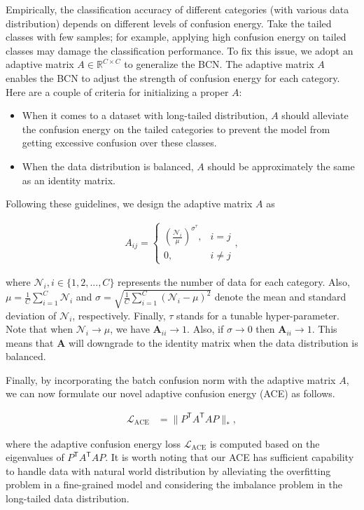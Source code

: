\documentclass{article}
\newcommand{\bA}{{\mathbf{A}}}
\newcommand{\bbR}{{\mathbb{R}}}
\newcommand{\cL}{{\mathcal{L}}}
\begin{document}
Empirically, the classification accuracy of different categories (with various data distribution) depends on different levels of confusion energy. Take the tailed classes with few samples; for example, applying high confusion energy on tailed classes may damage the classification performance. To fix this issue, we adopt an adaptive matrix $A \in \bbR^{C \times C}$ to generalize the BCN. The adaptive matrix $A$ enables the BCN to adjust the strength of confusion energy for each category. Here are a couple of criteria for initializing a proper $A$:
\begin{itemize}
    \item When it comes to a dataset with long-tailed distribution, $A$ should alleviate the confusion energy on the tailed categories to prevent the model from getting excessive confusion over these classes. 
    \item When the data distribution is balanced, $A$ should be approximately the same as an identity matrix.
\end{itemize}

Following these guidelines, we design the adaptive matrix $A$ as
\begin{linenomath}
\begin{align}
    A_{ij} = \left\{ \begin{array}{ll}
    (\frac{\mathcal{N}_i}{\mu})^{\sigma^\tau}, & i = j\\
    0,                          &  i \neq j
    \end{array}
    \right.,
    \label{eqn:A}
\end{align}
\end{linenomath}
where $\mathcal{N}_i, i \in \lbrace 1, 2, ..., C \rbrace$ represents the number of data for each category. Also, $\mu = \frac{1}{C} \sum_{i=1}^C \mathcal{N}_i$ and $\sigma = \sqrt{\frac{1}{C} \sum_{i=1}^C (\mathcal{N}_i - \mu)^2}$ denote the mean and standard deviation of $\mathcal{N}_i$, respectively. Finally, $\tau$ stands for a tunable hyper-parameter. Note that when $\mathcal{N}_i \longrightarrow \mu$, we have $\bA_{ii} \longrightarrow 1$. Also, if $\sigma \longrightarrow 0$ then $\bA_{ii} \longrightarrow 1$. This means that $\bA$ will downgrade to the identity matrix when the data distribution is balanced.

Finally, by incorporating the batch confusion norm with the adaptive matrix $A$, we can now formulate our novel adaptive confusion energy (ACE) as follows. 
\begin{linenomath}
\begin{align}
    \mathcal{L}_\mathrm{ACE} & = \| P^\mathsf{T} A^\mathsf{T} A P \|_*,
    \label{eqn:loss_ACE}
\end{align}
\end{linenomath}
where the adaptive confusion energy loss $\cL_{\mathrm{ACE}}$ is computed based on the eigenvalues of $P^\mathsf{T} A^\mathsf{T} A P$. 
It is worth noting that our ACE has sufficient capability to handle data with natural world distribution by alleviating the overfitting problem in a fine-grained model and considering the imbalance problem in the long-tailed data distribution.
\end{document}

